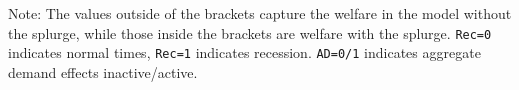 \documentclass{econsocart}
\begin{document}
\begin{table}[tb] 
  \caption{\pregenmark Welfare for policies both out of and in a recession, with/without AD effects}
  \label{tab:welfare6-SplurgeComp} 
  \centering


  \noindent\parbox{\textwidth}{
    \medskip
    \footnotesize Note: The values outside of the brackets capture the welfare in the model without the splurge, while those inside the brackets are welfare with the splurge. \texttt{Rec=0} indicates normal times, \texttt{Rec=1} indicates recession. \texttt{AD=0/1} indicates aggregate demand effects inactive/active.
  }
\end{table}

\vspace{0.5em}
\end{document}
